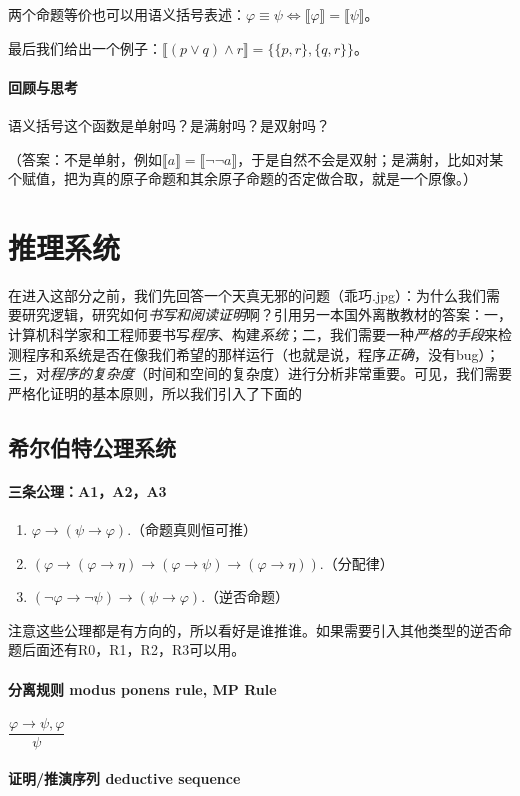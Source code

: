 \documentclass[b5paper,oneside]{ctexbook}
\begin{document}
两个命题等价也可以用语义括号表述：$\varphi\equiv\psi\Leftrightarrow\llbracket\varphi\rrbracket =\llbracket\psi\rrbracket$。

最后我们给出一个例子：$\llbracket (p\lor q)\land r\rrbracket = \{\{p,r\},\{q,r\}\}$。
\paragraph{回顾与思考}语义括号这个函数是单射吗？是满射吗？是双射吗？

（答案：不是单射，例如$\llbracket a\rrbracket =\llbracket \neg\neg a\rrbracket$，于是自然不会是双射；是满射，比如对某个赋值，把为真的原子命题和其余原子命题的否定做合取，就是一个原像。）
\section{推理系统}
在进入这部分之前，我们先回答一个天真无邪的问题（乖巧.jpg）：为什么我们需要研究逻辑，研究如何\emph{书写和阅读证明}啊？引用另一本国外离散教材的答案：一，计算机科学家和工程师要书写\emph{程序}、构建\emph{系统}；二，我们需要一种\emph{严格的手段}来检测程序和系统是否在像我们希望的那样运行（也就是说，程序\textit{正确}，没有bug）；三，对\textit{程序的复杂度}（时间和空间的复杂度）进行分析非常重要。可见，我们需要严格化证明的基本原则，所以我们引入了下面的
\subsection{希尔伯特公理系统}
\paragraph{三条公理：A1，A2，A3}
\begin{enumerate}
\item $\varphi \to (\psi\to\varphi)$.（命题真则恒可推）
\item $(\varphi\to(\varphi\to\eta)\to(\varphi\to\psi)\to(\varphi\to\eta))$.（分配律）
\item $(\neg\varphi\to\neg\psi)\to(\psi\to\varphi)$.（逆否命题）
\end{enumerate}

注意这些公理都是有方向的，所以看好是谁推谁。如果需要引入其他类型的逆否命题后面还有R0，R1，R2，R3可以用。
\paragraph{分离规则 modus ponens rule, MP Rule}$\dfrac{\varphi\to\psi ,\varphi}{\psi}$
\paragraph{证明/推演序列 deductive sequence}\label{dedseq}
\end{document}
